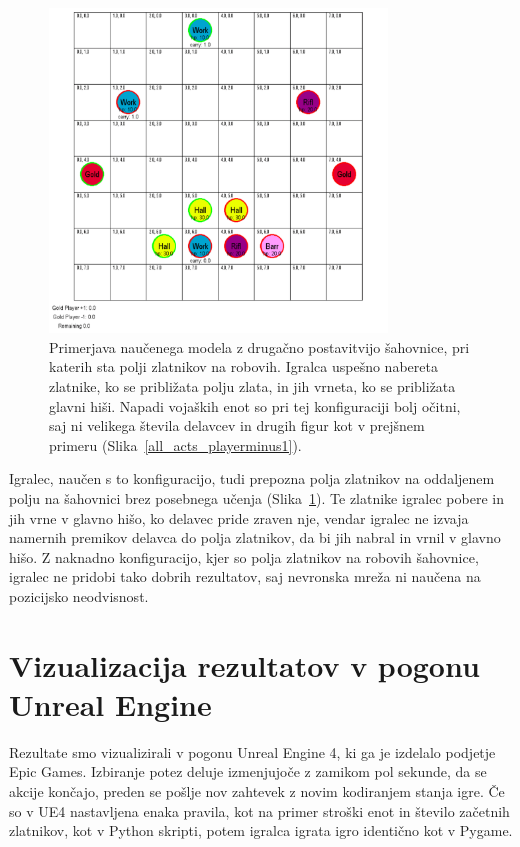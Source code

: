 \documentclass[a4paper, 12pt]{book}
\begin{document}
{\begin{figure}[h!]
	\begin{center}
		\includegraphics[width=0.8\textwidth]{photos/pit_minerals_apart_100.pdf}
	\end{center}
	\caption{Primerjava naučenega modela z drugačno postavitvijo šahovnice, pri katerih sta polji zlatnikov na robovih.
		Igralca uspešno nabereta zlatnike, ko se približata polju zlata, in jih vrneta, ko se približata glavni hiši.
		Napadi vojaških enot so pri tej konfiguraciji bolj očitni, saj ni velikega števila delavcev in drugih figur kot v prejšnem primeru (Slika~\ref{all_acts_playerminus1}).}
	\label{pit_minerals_apart_100}
\end{figure}

Igralec, naučen s to konfiguracijo, tudi prepozna polja zlatnikov na oddaljenem polju na šahovnici brez posebnega učenja (Slika~\ref{pit_minerals_apart_100}).
Te zlatnike igralec pobere in jih vrne v glavno hišo, ko delavec pride zraven nje, vendar igralec ne izvaja namernih premikov delavca do polja zlatnikov, da bi jih nabral in vrnil v glavno hišo.
Z naknadno konfiguracijo, kjer so polja zlatnikov na robovih šahovnice, igralec ne pridobi tako dobrih rezultatov, saj nevronska mreža ni naučena na pozicijsko neodvisnost.


\section{Vizualizacija rezultatov v pogonu Unreal Engine}
Rezultate smo vizualizirali v pogonu Unreal Engine 4, ki ga je izdelalo podjetje Epic Games.
Izbiranje potez deluje izmenjujoče z zamikom pol sekunde, da se akcije končajo, preden se pošlje nov zahtevek z novim kodiranjem stanja igre.
Če so v UE4 nastavljena enaka pravila, kot na primer stroški enot in število začetnih zlatnikov, kot v Python skripti, potem igralca igrata igro identično kot v Pygame.

}
\end{document}

